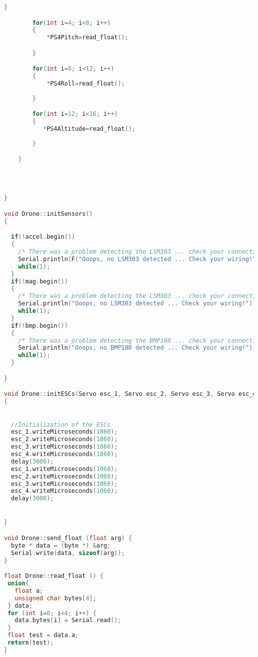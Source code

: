 \begin{lstlisting}[language=C,caption={Drone.cpp Arduino Library File},label={lst:Drone.cpp}]
        }

        for(int i=4; i<8; i++)
        {
            *PS4Pitch=read_float();

        }

        for(int i=8; i<12; i++)
        {
            *PS4Roll=read_float();
            
        }

        for(int i=12; i<16; i++)
        {
           *PS4Altitude=read_float();
            
        }

    }
    
    


}

void Drone::initSensors()
{

  if(!accel.begin())
  {
    /* There was a problem detecting the LSM303 ... check your connections */
    Serial.println(F("Ooops, no LSM303 detected ... Check your wiring!"));
    while(1);
  }
  if(!mag.begin())
  {
    /* There was a problem detecting the LSM303 ... check your connections */
    Serial.println("Ooops, no LSM303 detected ... Check your wiring!");
    while(1);
  }
  if(!bmp.begin())
  {
    /* There was a problem detecting the BMP180 ... check your connections */
    Serial.println("Ooops, no BMP180 detected ... Check your wiring!");
    while(1);
  }

}

void Drone::initESCs(Servo esc_1, Servo esc_2, Servo esc_3, Servo esc_4)
{
    

  //Initialization of the ESCs
  esc_1.writeMicroseconds(1860);
  esc_2.writeMicroseconds(1860);
  esc_3.writeMicroseconds(1860);
  esc_4.writeMicroseconds(1860);
  delay(3000);
  esc_1.writeMicroseconds(1060);
  esc_2.writeMicroseconds(1060);
  esc_3.writeMicroseconds(1060);
  esc_4.writeMicroseconds(1060);
  delay(3000);


}

void Drone::send_float (float arg) {
  byte * data = (byte *) &arg;
  Serial.write(data, sizeof(arg));
}

float Drone::read_float () {
 union{
   float a;
   unsigned char bytes[4];
 } data;
 for (int i=0; i<4; i++) {
   data.bytes[i] = Serial.read();
 }
 float test = data.a;
 return(test);
}



\end{lstlisting}

\newpage

